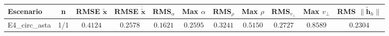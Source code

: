 \begin{tabular}{lcccccccccc}
\toprule
Escenario & n & RMSE $\tilde{\mathbf{x}}$ & RMSE $\dot{\tilde{\mathbf{x}}}$ & RMS$_\alpha$ & Max $\alpha$ & RMS$_\rho$ & Max $\rho$ & RMS$_{v_\perp}$ & Max $v_\perp$ & RMS $\|\tilde{\mathbf{h}}_h\|$ \\
\midrule
E4\_circ\_asta & 1/1 & $0.4124$ & $0.2578$ & $0.1621$ & $0.2595$ & $0.3241$ & $0.5150$ & $0.2727$ & $0.8589$ & $0.2304$ \\
\bottomrule
\end{tabular}
